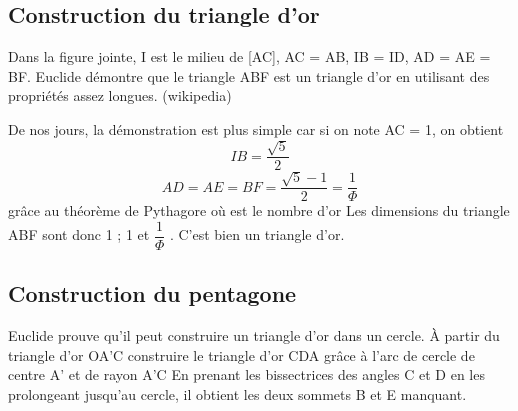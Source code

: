 \documentclass[]{scrartcl}
\begin{document}


\newpage  
\subsection{Construction du triangle d'or}

Dans la figure jointe, I est le milieu de [AC], AC = AB, IB = ID, AD = AE = BF. Euclide démontre que le triangle ABF est un triangle d'or en utilisant des propriétés assez longues. (wikipedia)

De nos jours, la démonstration est plus simple car si on note AC = 1, on obtient 
\[
  IB=\frac{\sqrt{5}}{2}
\]   
\[
  AD=AE=BF=\frac{\sqrt{5}-1}{2}=\frac{1}{\Phi}
\]
 grâce au théorème de Pythagore
 où  est le nombre d'or
Les dimensions du triangle ABF sont donc 1 ; 1 et $\dfrac{1}{\Phi}$ . C'est bien un triangle d'or.


\bigskip


\newpage  
\subsection{Construction du pentagone }

Euclide prouve qu'il peut construire un triangle d'or dans un cercle.
À partir du triangle d'or OA'C construire le triangle d'or CDA grâce à l'arc de cercle de centre A' et de rayon A'C
En prenant les bissectrices des angles C et D en les prolongeant jusqu'au cercle, il obtient les deux sommets B et E manquant.  
\end{document}
